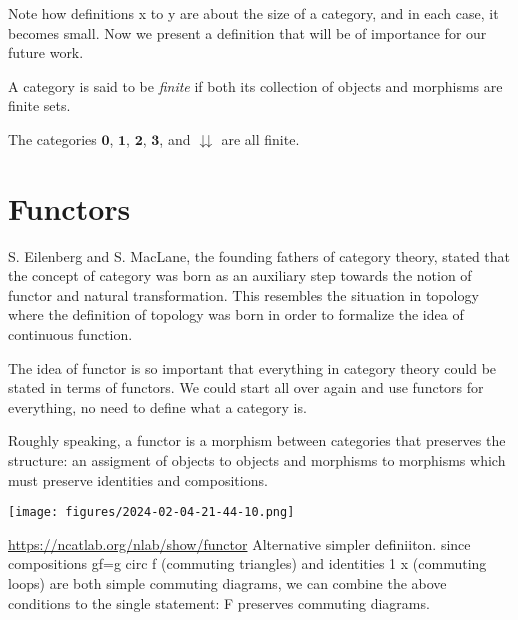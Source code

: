 Note how definitions x to y are about the size of a category, and in each case, it becomes small.
Now we present a definition that will be of importance for our future work.

\begin{definition}
    A category is said to be \textit{finite} if both its collection of objects and morphisms are finite sets.
\end{definition}

\begin{example}
    The categories
    \(\mathbf{0}\), \(\mathbf{1}\), \(\mathbf{2}\), \(\mathbf{3}\), and \( \downdownarrows\) are all finite.
\end{example}


\section{Functors}

S. Eilenberg and S. MacLane, the founding fathers of category theory, stated that the concept of category was born as an auxiliary step towards the notion of functor and natural transformation.  This resembles the situation in topology where the definition of topology was born in order to formalize the idea of continuous function.

The idea of functor is so important that everything in category theory could be stated in terms of functors. We could start all over again and use functors for everything, no need to define what a category is.

Roughly speaking, a functor is a morphism between categories that preserves the structure: an assigment of  objects to objects and morphisms to morphisms which must preserve identities and compositions. 

\begin{marginfigure}
    \centering
    \texttt{[image: figures/2024-02-04-21-44-10.png]}
    \caption{\url{https://ncatlab.org/nlab/show/functor} Alternative simpler definiiton.  since compositions gf=g circ f (commuting triangles) and identities 1 x (commuting loops) are both simple commuting diagrams, we can combine the above conditions to the single statement:    F preserves commuting diagrams.}%
\end{marginfigure}

